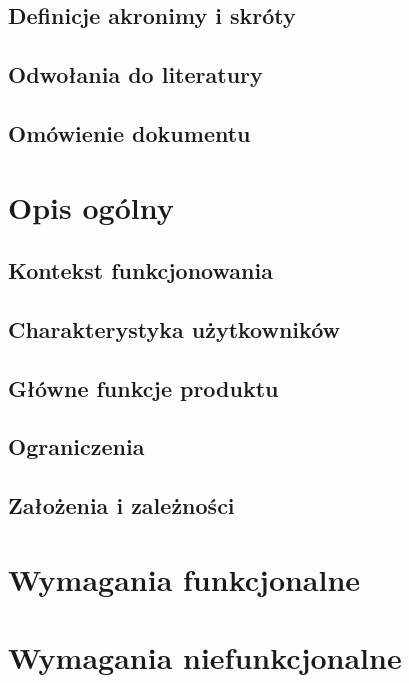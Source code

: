 \documentclass[14pt,a4paper]{article}
\begin{document}
\subsection{Definicje akronimy i skróty}
\subsection{Odwołania do literatury}
\subsection{Omówienie dokumentu}
\section{Opis ogólny}
\subsection{Kontekst funkcjonowania}
\subsection{Charakterystyka użytkowników}
\subsection{Główne funkcje produktu}
\subsection{Ograniczenia}
\subsection{Założenia i zależności}
\section{Wymagania funkcjonalne}
\section{Wymagania niefunkcjonalne}
\end{document}
